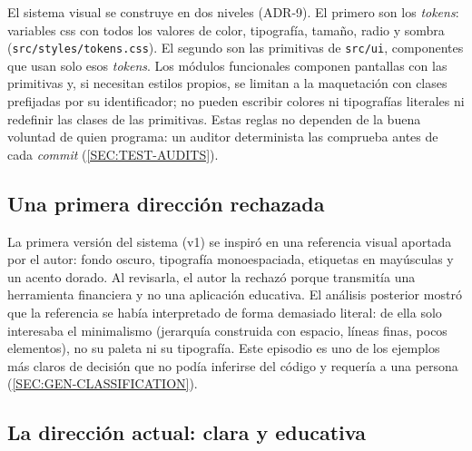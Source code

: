 El sistema visual se construye en dos niveles (ADR-9). El primero son los
\textit{tokens}: variables \acs{css} con todos los valores de color, tipografía, tamaño,
radio y sombra (\texttt{src/styles/tokens.css}). El segundo son las primitivas de
\texttt{src/ui}, componentes que usan solo esos \textit{tokens}. Los módulos funcionales
componen pantallas con las primitivas y, si necesitan estilos propios, se limitan a la
maquetación con clases prefijadas por su identificador; no pueden escribir colores ni
tipografías literales ni redefinir las clases de las primitivas. Estas reglas no dependen
de la buena voluntad de quien programa: un auditor determinista las comprueba antes de cada
\textit{commit} (\cref{SEC:TEST-AUDITS}).

\subsection{Una primera dirección rechazada}

La primera versión del sistema (v1) se inspiró en una referencia visual aportada por el
autor: fondo oscuro, tipografía monoespaciada, etiquetas en mayúsculas y un acento dorado.
Al revisarla, el autor la rechazó porque transmitía una herramienta financiera y no una
aplicación educativa. El análisis posterior mostró que la referencia se había interpretado
de forma demasiado literal: de ella solo interesaba el minimalismo (jerarquía construida con
espacio, líneas finas, pocos elementos), no su paleta ni su tipografía. Este episodio es
uno de los ejemplos más claros de decisión que no podía inferirse del código y requería a
una persona (\cref{SEC:GEN-CLASSIFICATION}).


\subsection{La dirección actual: clara y educativa}

